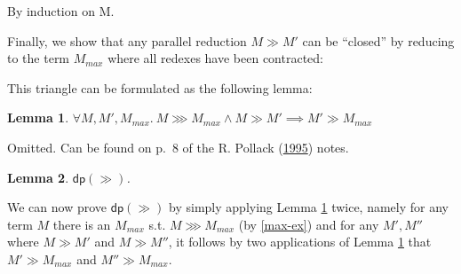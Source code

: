 \documentclass[a4paper, 12pt, twoside]{style/ociamthesis}
\makeatletter
\theoremstyle{plain}
\newtheorem{Lemma}{Lemma}[chapter]
\theoremstyle{definition}
\theoremstyle{remark}
\renewenvironment{proof}[1][\proofname]{\par
  \vspace{-\topsep}%
  \pushQED{\qed}%
  \normalfont
  \topsep0pt \partopsep0pt %
  \trivlist
  \item[\hskip\labelsep
        \itshape
    #1\@addpunct{.}]\ignorespaces
}{%
  \popQED\endtrivlist\@endpefalse
  \addvspace{6pt plus 6pt} %
}
\newcommand{\dip}{\textsf{dp}}
\makeatother
\begin{document}
\begin{proof}

By induction on M.

\end{proof}

Finally, we show that any parallel reduction \(M \gg M'\) can be
``closed'' by reducing to the term \(M_{max}\) where all redexes have
been contracted:

\begin{center}
\end{center}

This triangle can be formulated as the following lemma:

\begin{Lemma}

\label{max-close}
\(\forall M, M', M_{max}.\ M \ggg M_{max} \land M \gg M' \implies M' \gg M_{max}\)

\end{Lemma}

\begin{proof}

Omitted. Can be found on p.~8 of the R. Pollack
(\protect\hyperlink{ref-pollack95}{1995}) notes.

\end{proof}

\begin{Lemma}

\(\dip(\gg)\).

\end{Lemma}

\begin{proof}

We can now prove \(\dip(\gg)\) by simply applying Lemma \ref{max-close}
twice, namely for any term \(M\) there is an \(M_{max}\) s.t.
\(M \ggg M_{max}\) (by \ref{max-ex}) and for any \(M', M''\) where
\(M \gg M'\) and \(M \gg M''\), it follows by two applications of Lemma
\ref{max-close} that \(M' \gg M_{max}\) and \(M'' \gg M_{max}\).

\end{proof}
\end{document}
